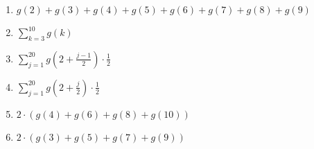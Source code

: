 \documentclass[12pt]{report}
\begin{document}
\begin{enumerate}
\begin{enumerate}
\item $g(2)+g(3)+g(4)+g(5)+g(6)+g(7)+g(8)+g(9)$

\item $\sum_{k=3}^{10}g(k)$

\item $\sum_{j=1}^{20}g\left(2+\frac{j-1}{2}\right)\cdot \frac{1}{2}$

\item $\sum_{j=1}^{20}g\left(2+\frac{j}{2}\right)\cdot \frac{1}{2}$

\item $2\cdot (g(4)+g(6)+g(8)+g(10))$

\item $2\cdot (g(3)+g(5)+g(7)+g(9))$



\end{enumerate}



\end{enumerate}
\end{document}

